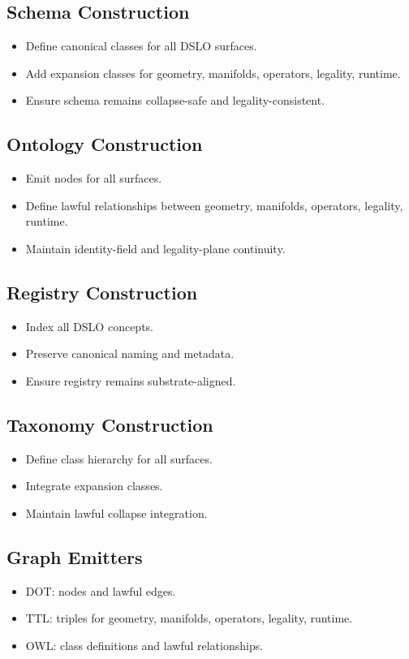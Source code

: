 \subsection{Schema Construction}
\begin{itemize}
    \item Define canonical classes for all DSLO surfaces.
    \item Add expansion classes for geometry, manifolds, operators, legality, runtime.
    \item Ensure schema remains collapse-safe and legality-consistent.
\end{itemize}

\subsection{Ontology Construction}
\begin{itemize}
    \item Emit nodes for all surfaces.
    \item Define lawful relationships between geometry, manifolds, operators, legality, runtime.
    \item Maintain identity-field and legality-plane continuity.
\end{itemize}

\subsection{Registry Construction}
\begin{itemize}
    \item Index all DSLO concepts.
    \item Preserve canonical naming and metadata.
    \item Ensure registry remains substrate-aligned.
\end{itemize}

\subsection{Taxonomy Construction}
\begin{itemize}
    \item Define class hierarchy for all surfaces.
    \item Integrate expansion classes.
    \item Maintain lawful collapse integration.
\end{itemize}

\subsection{Graph Emitters}
\begin{itemize}
    \item DOT: nodes and lawful edges.
    \item TTL: triples for geometry, manifolds, operators, legality, runtime.
    \item OWL: class definitions and lawful relationships.
\end{itemize}

